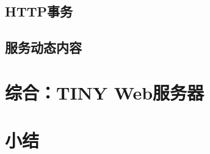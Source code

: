 \pending

\subsection{HTTP事务}

\pending

\subsection{服务动态内容}

\pending

\section{综合：TINY Web服务器}

\pending

\section{小结}

\pending
